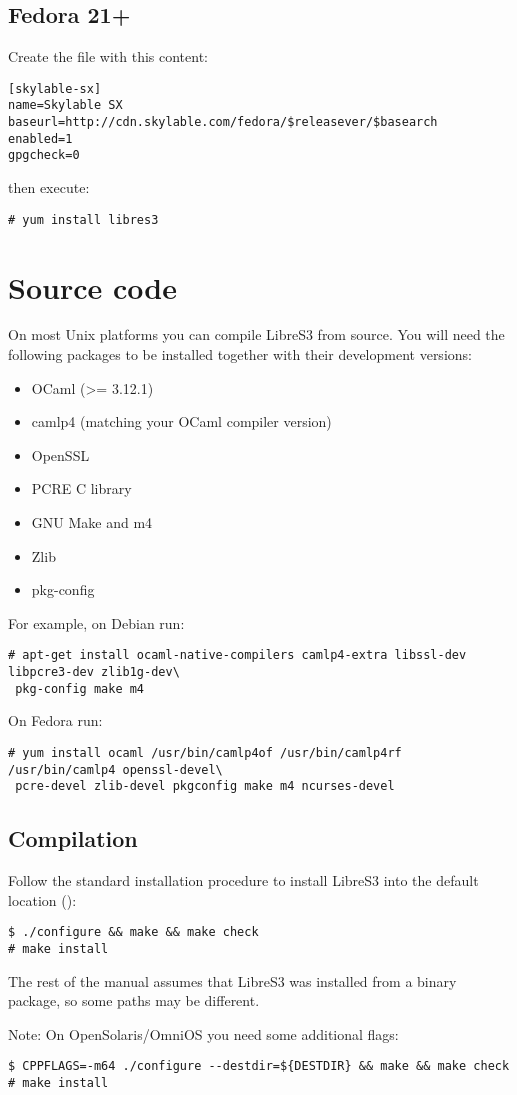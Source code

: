 \subsection{Fedora 21+}
Create the file  with this content:
\begin{lstlisting}
[skylable-sx]
name=Skylable SX
baseurl=http://cdn.skylable.com/fedora/$releasever/$basearch
enabled=1
gpgcheck=0
\end{lstlisting}
then execute:
\begin{lstlisting}
# yum install libres3
\end{lstlisting}

\section{Source code}

On most Unix platforms you can compile LibreS3
from source. You will need the following packages to be installed together with their
development versions:
\begin{itemize}
    \item OCaml (>= 3.12.1)
    \item camlp4 (matching your OCaml compiler version)
    \item OpenSSL
    \item PCRE C library
    \item GNU Make and m4
    \item Zlib
    \item pkg-config
\end{itemize}
For example, on Debian run:

\begin{lstlisting}
# apt-get install ocaml-native-compilers camlp4-extra libssl-dev libpcre3-dev zlib1g-dev\
 pkg-config make m4
\end{lstlisting}

On Fedora run:

\begin{lstlisting}
# yum install ocaml /usr/bin/camlp4of /usr/bin/camlp4rf /usr/bin/camlp4 openssl-devel\
 pcre-devel zlib-devel pkgconfig make m4 ncurses-devel
\end{lstlisting}


\subsection{Compilation}

Follow the standard installation procedure to install
LibreS3 into the default location ():

\begin{lstlisting}
$ ./configure && make && make check
# make install
\end{lstlisting}
The rest of the manual assumes that LibreS3 was installed from a binary
package, so some paths may be different.

Note: On OpenSolaris/OmniOS you need some additional flags:
\begin{lstlisting}
$ CPPFLAGS=-m64 ./configure --destdir=${DESTDIR} && make && make check
# make install
\end{lstlisting}
